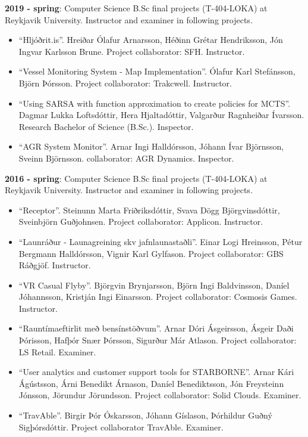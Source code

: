 \textbf{2019 - spring}:
Computer Science B.Sc final projects (T-404-LOKA) at Reykjavik University.
Instructor and examiner in following projects.

\begin{itemize}
\item ``Hljóðrit.is''. Hreiðar Ólafur Arnarsson, Héðinn Grétar Hendriksson, Jón
    Ingvar Karlsson Brune. Project collaborator: SFH. Instructor.

\item ``Vessel Monitoring System - Map Implementation''. Ólafur Karl Stefánsson,
	Björn Þórsson. Project collaborator: Trakcwell. Instructor.

\item ``Using SARSA with function approximation to create policies for MCTS''.
	Dagmar Lukka Loftsdóttir, Hera Hjaltadóttir, Valgarður Ragnheiðar Ívarsson.
		Research Bachelor of Science (B.Sc.). Inspector.

\item ``AGR System Monitor''. Arnar Ingi Halldórsson, Jóhann Ívar Björnsson,
    Sveinn Björnsson. collaborator: AGR Dynamics. Inspector.
\end{itemize}

\textbf{2016 - spring}:
Computer Science B.Sc final projects (T-404-LOKA) at Reykjavik University.
Instructor and examiner in following projects.

\begin{itemize}
\item ``Receptor''. Steinunn Marta Friðriksdóttir, Svava Dögg Björgvinsdóttir,
    Sveinbjörn Guðjohnsen. Project collaborator: Applicon. Instructor.

\item ``Launráður - Launagreining skv jafnlaunastaðli''. Einar Logi Hreinsson,
    Pétur Bergmann Halldórsson, Vignir Karl Gylfason. Project collaborator: GBS
        Ráðgjöf. Instructor.

\item ``VR Casual Flyby''. Björgvin Brynjarsson, Björn Ingi Baldvinsson, Daníel
    Jóhannsson, Kristján Ingi Einarsson. Project collaborator: Cosmosis Games.
        Instructor.

\item ``Rauntímaeftirlit með bensínstöðvum''. Arnar Dóri Ásgeirsson, Ásgeir
    Daði Þórisson, Hafþór Snær Þórsson, Sigurður Már Atlason. Project
        collaborator: LS Retail. Examiner.

\item ``User analytics and customer support tools for STARBORNE''. Arnar Kári
    Ágústsson, Árni Benedikt Árnason, Daníel Benediktsson, Jón Freysteinn
        Jónsson, Jörundur Jörundsson. Project collaborator: Solid Clouds.
        Examiner.

\item ``TravAble''. Birgir Þór Óskarsson, Jóhann Gíslason, Þórhildur Guðný
    Sigþórsdóttir. Project collaborator TravAble. Examiner.
\end{itemize}


